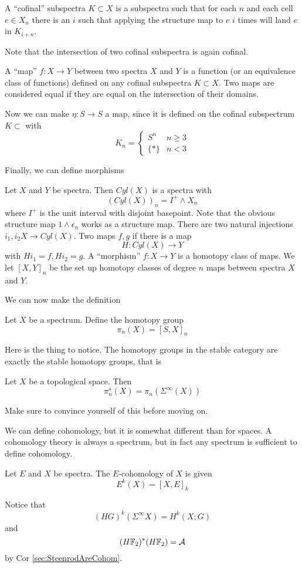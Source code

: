 \begin{Def}
  A ``cofinal'' subspectra $K\subset X$ is a subspectra such that for each $n$ and each cell $
  e\in X_n$ there is an $i$ such that applying the structure map to $e$ $i$ times will land $e$ in $K_{i+n}$.  
\end{Def}

Note that the intersection of two cofinal subspectra is again cofinal.  

\begin{Def}
  A ``map'' $f:X\to Y$ between two spectra $X$ and $Y$ is a function (or an equivalence class of functions) defined on any cofinal subspectra $K\subset X$.  
  Two maps are considered equal if they are equal on the intersection of their domains.  
\end{Def}

Now we can make $\eta:S\to S$ a map, since it is defined on the cofinal subspectrum $K\subset$ with
\[K_n = \left\{\begin{array}{cc} 
S^n & n \ge 3\\
\{*\} & n < 3
\end{array}\right.\]

Finally, we can define morphisms
\begin{Def}
  Let $X$ and $Y$ be spectra.  Then $Cyl(X)$ is a spectra with 
  \[(Cyl(X))_n=I^+\wedge X_n\]
  where $I^+$ is the unit interval with disjoint basepoint.  
  Note that the obvious structure map $1\wedge \epsilon_n$ works as a structure map.  
  There are two natural injections $i_1,i_2 X\to Cyl(X)$.  
  Two maps $f,g$ if there is a map 
  \[H:Cyl(X)\to Y\]
  with $Hi_1=f, Hi_2=g$.  
  A ``morphism'' $f:X\to Y$ is a homotopy class of maps.  
  We let $[X,Y]_n$ be the set up homotopy classes of degree $n$ maps between spectra $X$ and $Y$.  
\end{Def}

We can now make the definition
\begin{Def}
  Let $X$ be a spectrum.  Define the homotopy group
  \[\pi_n(X)=[S,X]_n\]
\end{Def}
Here is the thing to notice.  
The homotopy groups in the stable category are exactly the stable homotopy groups, that is
\begin{Theorem}
  Let $X$ be a topological space.  Then
  \[\pi_n^s(X)=\pi_n(\Sigma^\infty(X))\]
\end{Theorem}

Make sure to convince yourself of this before moving on.  

We can define cohomology, but it is somewhat different than for spaces.  A cohomology theory is always a spectrum, but in fact any spectrum is sufficient to define cohomology.  
\begin{Def}
  Let $E$ and $X$ be spectra.  
  The $E$-cohomology of $X$ is given
  \[E^k(X)=[X,E]_k\]
\end{Def}
Notice that 
\[(HG)^k(\Sigma^\infty X)=H^k(X;G)\]
and
\[(H\mathbb{F}_2)^*(H\mathbb{F}_2)=\mathcal{A}\]
by Cor  \ref{sec:SteenrodAreCohom}.  


